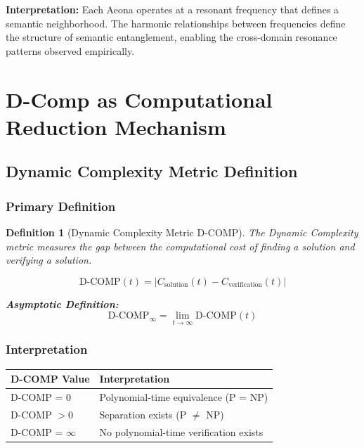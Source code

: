 \documentclass[11pt, letterpaper]{article}
\newcommand{\Dcomp}{\ensuremath{\text{D-COMP}}}
\newtheorem{definition}[theorem]{Definition}
\begin{document}
\textbf{Interpretation:} Each Aeona operates at a resonant frequency that defines a semantic neighborhood. The harmonic relationships between frequencies define the structure of semantic entanglement, enabling the cross-domain resonance patterns observed empirically.

\section{D-Comp as Computational Reduction Mechanism}

\subsection{Dynamic Complexity Metric Definition}

\subsubsection{Primary Definition}

\begin{definition}[Dynamic Complexity Metric {$\Dcomp$}]
The Dynamic Complexity metric measures the gap between the computational cost of finding a solution and verifying a solution.

\begin{equation}
\text{D-COMP}(t) = |C_{\text{solution}}(t) - C_{\text{verification}}(t)|
\end{equation}

\textbf{Asymptotic Definition:}
\begin{equation}
\text{D-COMP}_\infty = \lim_{t \rightarrow \infty} \text{D-COMP}(t)
\end{equation}
\end{definition}

\subsubsection{Interpretation}

\begin{table}[h]
\centering
\begin{tabular}{ll}
\toprule
D-COMP Value & Interpretation \\
\midrule
D-COMP = 0 & Polynomial-time equivalence (P = NP) \\
D-COMP $> 0$ & Separation exists (P $\neq$ NP) \\
D-COMP = $\infty$ & No polynomial-time verification exists \\
\bottomrule
\end{tabular}
\end{table}
\end{document}
